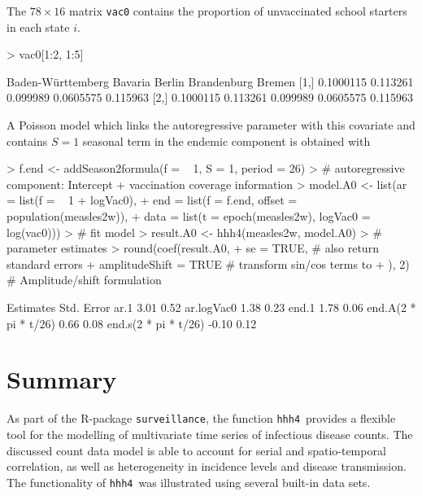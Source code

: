 \documentclass[a4paper,11pt]{article}
\newcommand{\surveillance}{\texttt{surveillance}}
\newcommand{\code}[1]{\texttt{#1}}
\newcommand{\hhh}{\texttt{hhh4}}
\newcommand{\R}{\textsf{R}}
\begin{document}
The $78\times 16$ matrix \code{vac0} contains 
the proportion of unvaccinated school starters in each state $i$.
\begin{Schunk}
\begin{Sinput}
> vac0[1:2, 1:5]
\end{Sinput}
\begin{Soutput}
     Baden-Württemberg  Bavaria   Berlin Brandenburg   Bremen
[1,]         0.1000115 0.113261 0.099989   0.0605575 0.115963
[2,]         0.1000115 0.113261 0.099989   0.0605575 0.115963
\end{Soutput}
\end{Schunk}
A Poisson model which links the autoregressive parameter with this covariate
and contains $S=1$ seasonal term in the endemic component 
\citep[cf.~model A0 in Tab.~3 in ][]{herzog-etal-2010} is obtained with
\begin{Schunk}
\begin{Sinput}
> f.end <- addSeason2formula(f = ~ 1, S = 1, period = 26)
> # autoregressive component: Intercept + vaccination coverage information
> model.A0 <- list(ar = list(f = ~ 1 + logVac0),
+                  end = list(f = f.end, offset = population(measles2w)),
+                  data = list(t = epoch(measles2w), logVac0 = log(vac0)))
> # fit model
> result.A0 <- hhh4(measles2w, model.A0)    
> # parameter estimates
> round(coef(result.A0, 
+            se = TRUE,              # also return standard errors
+            amplitudeShift = TRUE   # transform sin/cos terms to 
+            ), 2)                   # Amplitude/shift formulation
\end{Sinput}
\begin{Soutput}
                     Estimates Std. Error
ar.1                      3.01       0.52
ar.logVac0                1.38       0.23
end.1                     1.78       0.06
end.A(2 * pi * t/26)      0.66       0.08
end.s(2 * pi * t/26)     -0.10       0.12
\end{Soutput}
\end{Schunk}

 \section{Summary}
As part of the \R-package \surveillance, the function \hhh\ provides
a flexible tool for the modelling of multivariate time series 
of infectious disease counts. The discussed count data model is able to
account for serial and spatio-temporal correlation, as well as
heterogeneity in incidence levels and disease transmission. 
The functionality of \hhh\ was illustrated using several built-in data 
sets.


\end{document}
